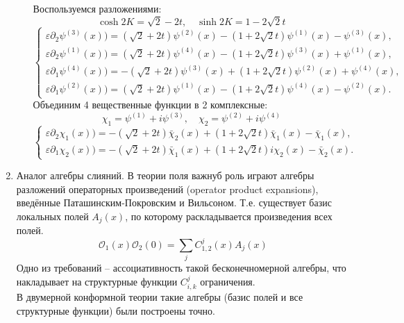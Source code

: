 \documentclass[12pt]{article}
\theoremstyle{definition}
\begin{document}
\begin{enumerate}
\begin{itemize}
    Воспользуемся разложениями:
    \begin{equation}
        \cosh2K=\sqrt{2}-2t,\quad \sinh2K=1-2\sqrt{2}t
    \end{equation}
    \begin{equation}
        \begin{cases}
            \varepsilon\partial_2\psi^{(3)}(x))=(\sqrt{2}+2t)\psi^{(2)}(x)-(1+2\sqrt{2}t)\psi^{(1)}(x)-\psi^{(3)}(x),\\
            \varepsilon\partial_2\psi^{(1)}(x))=(\sqrt{2}+2t)\psi^{(4)}(x)-(1+2\sqrt{2}t)\psi^{(3)}(x)+\psi^{(1)}(x),\\
            \varepsilon\partial_1\psi^{(4)}(x))=-(\sqrt{2}+2t)\psi^{(3)}(x)+(1+2\sqrt{2}t)\psi^{(2)}(x)+\psi^{(4)}(x),\\
            \varepsilon\partial_1\psi^{(2)}(x))=(\sqrt{2}+2t)\psi^{(1)}(x)-(1+2\sqrt{2}t)\psi^{(4)}(x)-\psi^{(2)}(x).
        \end{cases}
    \end{equation}
    Объединим 4 вещественные функции в 2 комплексные:
    \begin{equation}
        \chi_1=\psi^{(1)}+i\psi^{(3)},\quad\chi_2=\psi^{(2)}+i\psi^{(4)}
    \end{equation}
    \begin{equation}
        \begin{cases}
            \varepsilon\partial_2\chi_1(x))=-(\sqrt{2}+2t)\bar\chi_2(x)+(1+2\sqrt{2}t)\bar\chi_1(x)-\bar\chi_1(x),\\
            \varepsilon\partial_1\chi_2(x))=-(\sqrt{2}+2t)\bar\chi_1(x)+(1+2\sqrt{2}t)i\chi_2(x)-\bar\chi_2(x).
        \end{cases}
    \end{equation}
\end{itemize}
\item Аналог алгебры слияний. В теории поля важнуб роль играют алгебры разложений операторных произведений (operator product expansions), введённые Паташинским-Покровским и Вильсоном. Т.е. существует базис локальных полей $A_j(x)$, по которому раскладывается произведения всех полей.
\begin{equation}
    \mathcal{O}_1(x)\mathcal{O}_2(0)=\sum\limits_jC^j_{1,2}(x)A_j(x)
\end{equation}
Одно из требований -- ассоциативность такой бесконечномерной алгебры, что накладывает на структурные функции $C^j_{i,k}$ ограничения.\\
В двумерной конформной теории такие алгебры (базис полей и все структурные функции) были построены точно.\\

\end{enumerate}
\end{document}
